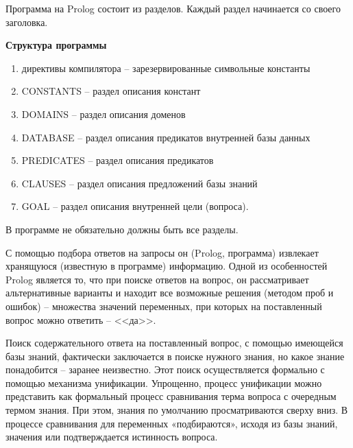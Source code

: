 \documentclass[a4paper,14pt]{extreport} %
\begin{document}
Программа на Prolog состоит из разделов. Каждый раздел начинается со своего заголовка. 

\textbf{Структура программы }
\begin{enumerate}
\item директивы компилятора -- зарезервированные символьные константы
\item CONSTANTS -- раздел описания констант
\item DOMAINS -- раздел описания доменов
\item DATABASE -- раздел описания предикатов внутренней базы данных
\item PREDICATES -- раздел описания предикатов
\item CLAUSES -- раздел описания предложений базы знаний
\item GOAL -- раздел описания внутренней цели (вопроса).
\end{enumerate}

В программе не обязательно должны быть все разделы.

С помощью подбора ответов на запросы он (Prolog, программа) извлекает хранящуюся (известную в программе) информацию. Одной из особенностей Prolog является то, что при поиске ответов на вопрос, он рассматривает альтернативные варианты и находит все возможные решения (методом проб и ошибок) -- множества значений переменных, при которых на поставленный вопрос можно ответить -- <<да>>.

Поиск содержательного ответа на поставленный вопрос, с помощью имеющейся базы знаний, фактически заключается в поиске нужного знания, но какое знание понадобится – заранее неизвестно. Этот поиск осуществляется формально с помощью механизма унификации. Упрощенно, процесс унификации можно представить как формальный процесс сравнивания терма вопроса с очередным термом знания. При этом, знания по умолчанию просматриваются сверху вниз. В процессе сравнивания для переменных «подбираются», исходя из базы знаний, значения или подтверждается истинность вопроса. 
\end{document}
